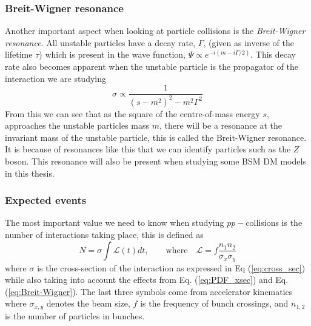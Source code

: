 \documentclass[12pt, a4paper]{book}
\begin{document}
\subsubsection{Breit-Wigner resonance}
Another important aspect when looking at particle collisions is the \textit{Breit-Wigner resonance}. All unstable particles have a decay rate, $\Gamma$, (given as inverse of the lifetime $\tau$) which is present in the wave function, 
$\Psi \propto e^{-i(m-i\Gamma/2)}$. This decay rate also becomes apparent when the unstable particle is the propagator of the interaction we are studying 
\begin{equation}\label{eq:Breit-Wigner}
    \sigma \propto\frac{1}{(s-m^2)^2-m^2\Gamma^2}
\end{equation}
From this we can see that as the square of the centre-of-mass energy $s$, approaches the unstable particles mass $m$, there will be a resonance at the invariant mass of the unstable particle, this is called the Breit-Wigner resonance. 
It is because of resonances like this that we can identify particles such as the $Z$ boson. This resonance will also be present when studying some BSM DM models in this thesis.\\


\subsubsection{Expected events}
The most important value we need to know when studying $pp-$collisions is the number of interactions taking place, this is defined as
\begin{equation}\label{eq:expected_events}
    N=\sigma\int\mathcal{L}(t)dt, \qquad\text{where}\quad \mathcal{L}=f\frac{n_1n_2}{\sigma_x\sigma_y}
\end{equation}
where $\sigma$ is the cross-section of the interaction as expressed in Eq (\ref{eq:cross_sec}) while also taking into account the effects from Eq. (\ref{eq:PDF_xsec}) and Eq. (\ref{eq:Breit-Wigner}).
The last three symbols come from accelerator kinematics where $\sigma_{x,y}$ denotes the beam size, $f$ is the frequency of bunch crossings, and $n_{1,2}$ is the number of particles in bunches.





\clearpage
\end{document}
